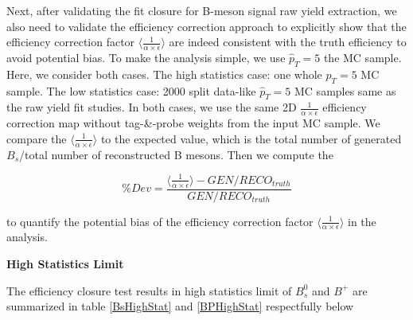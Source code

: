 Next, after validating the fit closure for B-meson signal raw yield extraction, we also need to validate the efficiency correction approach to explicitly show that the efficiency correction factor $\langle\frac{1}{\alpha \times \epsilon} \rangle$ are indeed consistent with the truth efficiency to avoid potential bias. To make the analysis simple, we use $\hat p_T = 5$ the MC sample. Here, we consider both cases. The high statistics case: one whole $\hat p_T = 5$ MC sample. The low statistics case: 2000 split data-like $\hat p_T = 5$ MC samples same as the raw yield fit studies. In both cases, we use the same 2D $\frac{1}{\alpha \times \epsilon}$ efficiency correction map without tag-\&-probe weights from the input MC sample. We compare the $\langle \frac{1}{\alpha \times \epsilon}\rangle$ to the expected value, which is the total number of generated $B_s$/total number of reconstructed B mesons. Then we compute the 


\begin{equation}
\% Dev = \frac{\langle \frac{1}{\alpha \times \epsilon} \rangle - GEN/RECO_{truth}}{GEN/RECO_{truth}}
\end{equation}
 
to quantify the potential bias of the efficiency correction factor $\langle \frac{1}{\alpha \times \epsilon} \rangle$ in the analysis. 

\textbf{High Statistics Limit}

The efficiency closure test results in high statistics limit of $B^0_s$ and $B^+$ are summarized in table \ref{BsHighStat} and \ref{BPHighStat} respectfully below


